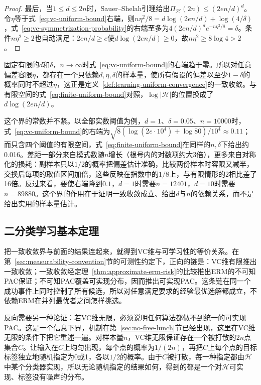\begin{proof}
最后，当$1\leq d\leq2n$时，Sauer--Shelah引理给出$\Pi_{\mathcal H}(2n)\leq(2en/d)^d$。令$\eta$等于式~\eqref{eq:vc-uniform-bound}右端，则$n\eta^2/8=d\log(2en/d)+\log(4/\delta)$，式~\eqref{eq:vc-symmetrization-probability}的右端至多为$4(2en/d)^de^{-n\eta^2/8}=\delta$。条件$n\eta^2\geq2$也自动满足：$2en/d\geq e$使$d\log(2en/d)\geq0$，故$n\eta^2\geq8\log4>2$。
\end{proof}

固定有限的$d$和$\delta$，$n\to\infty$时式~\eqref{eq:vc-uniform-bound}的右端趋于零。所以对任意偏差容限$\eta$，都存在一个只依赖$d,\eta,\delta$的样本量，使所有假设的偏差以至少$1-\delta$的概率同时不超过$\eta$，这正是定义~\ref{def:learning-uniform-convergence}的一致收敛。与有限空间的式~\eqref{eq:finite-uniform-bound}对照，$\log|\mathcal H|$的位置换成了$d\log(2en/d)$。

这个界的常数并不紧。以全部实数阈值为例，$d=1$、$\delta=0.05$、$n=10000$时，式~\eqref{eq:vc-uniform-bound}的右端为$\sqrt{8(\log(2e\cdot10^4)+\log80)/10^4}\approx0.11$；而只含四个阈值的有限空间，式~\eqref{eq:finite-uniform-bound}在同样的$n,\delta$下给出约0.016。差距一部分来自模式数随$n$增长（根号内的对数项约大3倍），更多来自对称化的损耗：副样本只以$1/2$的概率把偏差估计准确，比较两份样本时容限又减半，交换后每项的取值区间加倍，这些反映在指数中的$1/8$上，与有限情形的$2$相比差了16倍。反过来看，要使右端降到$0.1$，$d=1$时需要$n=12401$，$d=10$时需要$n=89880$。这个界的作用在于证明一致收敛成立、给出$d$与$n$的依赖关系，而不是给出实用的样本量估计。

\subsection{二分类学习基本定理}

把一致收敛界与前面的结果连起来，就得到VC维与可学习性的等价关系。在第~\ref{sec:measurability-convention}节的可测性约定下，正向的链是：VC维有限推出一致收敛；一致收敛经定理~\ref{thm:approximate-erm-risk}的比较推出ERM的不可知PAC保证；不可知PAC覆盖可实现分布，因而推出可实现PAC。这条链在同一个成功事件上同时控制了所有候选，所以对任意满足要求的经验最优选解都成立，不依赖ERM在并列最优者之间怎样挑选。

反向需要另一种论证：若VC维无限，必须说明任何算法都做不到统一的可实现PAC。这是一个信息下界，机制在第~\ref{sec:no-free-lunch}节已经出现，这里在VC维无限的条件下把它重述一遍。对样本量$n$，VC维无限保证存在一个被打散的$2n$点集合$C$。让输入在$C$上均匀出现，每个点的概率为$1/(2n)$，再把$C$上每个点的目标标签独立地随机指定为0或1，各以$1/2$的概率。由于$C$被打散，每一种指定都由$\mathcal H$中某个分类器实现，所以无论随机指定的结果如何，得到的都是一个对$\mathcal H$可实现、标签没有噪声的分布。


